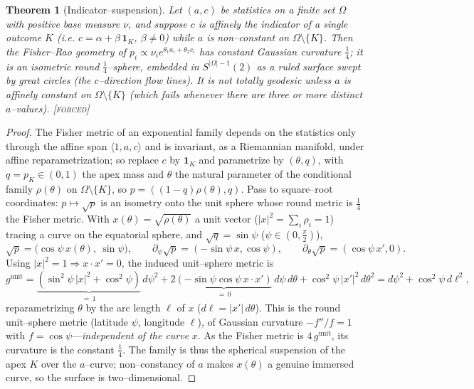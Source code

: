 \documentclass[11pt]{article}
\newtheorem{theorem}{Theorem}[section]
\theoremstyle{definition}
\newcommand{\forcedtag}{{\scshape [forced]}}
\begin{document}
\begin{theorem}[Indicator--suspension]\label{thm:susp}
Let $(a,c)$ be statistics on a finite set $\Omega$ with positive base measure $\nu$, and suppose $c$
is affinely the indicator of a single outcome $K$ (i.e. $c=\alpha+\beta\,\mathbf 1_K$, $\beta\neq0$)
while $a$ is non--constant on $\Omega\setminus\{K\}$. Then the Fisher--Rao geometry of
$p_i\propto\nu_i e^{\theta_1 a_i+\theta_2 c_i}$ has \emph{constant} Gaussian curvature $\tfrac14$; it
is an isometric round $\tfrac14$--sphere, embedded in $S^{|\Omega|-1}(2)$ as a \emph{ruled} surface
swept by great circles (the $c$--direction flow lines). It is \emph{not} totally geodesic unless $a$
is affinely constant on $\Omega\setminus\{K\}$ (which fails whenever there are three or more distinct
$a$--values). \forcedtag
\end{theorem}
\begin{proof}
The Fisher metric of an exponential family depends on the statistics only through the affine span
$\langle 1,a,c\rangle$ and is invariant, as a Riemannian manifold, under affine reparametrization; so
replace $c$ by $\mathbf 1_K$ and parametrize by $(\theta,q)$, with $q=p_K\in(0,1)$ the apex mass and
$\theta$ the natural parameter of the conditional family $\rho(\theta)$ on $\Omega\setminus\{K\}$, so
$p=((1-q)\rho(\theta),q)$. Pass to square--root coordinates: $p\mapsto\sqrt p$ is an isometry onto the
unit sphere whose round metric is $\tfrac14$ the Fisher metric. With $x(\theta)=\sqrt{\rho(\theta)}$ a
unit vector ($|x|^2=\sum_i\rho_i=1$) tracing a curve on the equatorial sphere, and $\sqrt q=\sin\psi$
($\psi\in(0,\tfrac\pi2)$),
\[
\sqrt p=\big(\cos\psi\,x(\theta),\ \sin\psi\big),\qquad
\partial_\psi\sqrt p=(-\sin\psi\,x,\cos\psi),\qquad
\partial_\theta\sqrt p=(\cos\psi\,x',0).
\]
Using $|x|^2=1\Rightarrow x\cdot x'=0$, the induced unit--sphere metric is
\[
g^{\text{unit}}=\underbrace{(\sin^2\!\psi\,|x|^2+\cos^2\!\psi)}_{=\,1}\,d\psi^2
+2\underbrace{(-\sin\psi\cos\psi\,x\!\cdot\! x')}_{=\,0}\,d\psi\,d\theta
+\cos^2\!\psi\,|x'|^2\,d\theta^2
= d\psi^2+\cos^2\!\psi\,d\ell^2,
\]
reparametrizing $\theta$ by the arc length $\ell$ of $x$ ($d\ell=|x'|\,d\theta$). This is the round
unit--sphere metric (latitude $\psi$, longitude $\ell$), of Gaussian curvature $-f''/f=1$ with
$f=\cos\psi$---\emph{independent of the curve} $x$. As the Fisher metric is $4\,g^{\text{unit}}$, its
curvature is the constant $\tfrac14$. The family is thus the spherical suspension of the apex $K$ over
the $a$--curve; non--constancy of $a$ makes $x(\theta)$ a genuine immersed curve, so the surface is
two--dimensional.
\end{proof}
\end{document}
